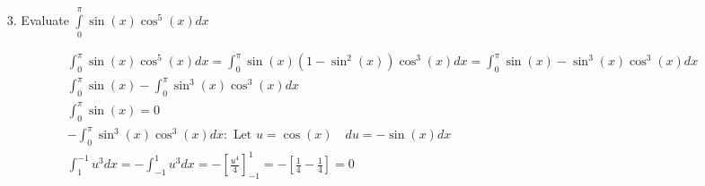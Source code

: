 \begin{itemize}
        \item [3.] Evaluate $\int\limits_{0}^{\pi}\sin(x)\cos^{5}(x)dx$
        \\
        \begin{mdframed}
            \begin{equation*}
                \begin{gathered}
                    \int_{0}^{\pi}\sin(x)\cos^{5}(x)dx = 
                    \int_{0}^{\pi}\sin(x)(1-\sin^{2}(x))\cos^{3}(x)dx =
                    \int_{0}^{\pi}\sin(x)-\sin^{3}(x)\cos^{3}(x)dx                  \\
                    \int_{0}^{\pi}\sin(x)-\int_{0}^{\pi}\sin^{3}(x)\cos^{3}(x)dx    \\
                    \int_{0}^{\pi}\sin(x) = 0                                       \\
                    -\int_{0}^{\pi}\sin^{3}(x)\cos^{3}(x)dx: 
                    \text{ Let } u = \cos(x) \quad du = -\sin(x)dx                  \\
                    \int_{1}^{-1}u^{3}dx = -\int_{-1}^{1}u^{3}dx = 
                    -\left[\frac{u^{4}}{4}\right]_{-1}^{1} =
                    -\left[\frac{1}{4}-\frac{1}{4}\right] = \boxed{0}
                \end{gathered}
            \end{equation*}
        \end{mdframed}
    \end{itemize}
